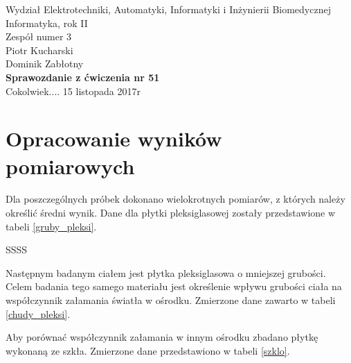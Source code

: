 \documentclass[a4paper,12pts]{article}
\begin{document}
	\thispagestyle{empty}
	\begin{flushleft}
		Wydział Elektrotechniki, Automatyki, Informatyki i Inżynierii Biomedycznej \\
		Informatyka, rok II \\
		Zespół numer 3 \\
		Piotr Kucharski \\
		Dominik Zabłotny \\
		\vspace*{\fill}
		{\large \textbf{Sprawozdanie z ćwiczenia nr 51} } \\
		Cokolwiek....		
		\vfill	
		15 listopada 2017r
	\end{flushleft}
	
	\newpage
	
	
	\section{Opracowanie wyników pomiarowych}
	Dla poszczególnych próbek dokonano wielokrotnych pomiarów, z których należy określić średni wynik. Dane dla płytki pleksiglasowej zostały przedstawione w tabeli \ref{gruby_pleksi}.
	
	
	SSSS
	
	Następnym badanym ciałem jest płytka pleksiglasowa o mniejszej grubości. Celem badania tego samego materiału jest określenie wpływu grubości ciała na współczynnik załamania światła w ośrodku. Zmierzone dane zawarto w tabeli \ref{chudy_pleksi}.
	
	
	Aby porównać współczynnik załamania w innym ośrodku zbadano płytkę wykonaną ze szkła. Zmierzone dane przedstawiono w tabeli \ref{szklo}.
	
	
		
	
\end{document}
